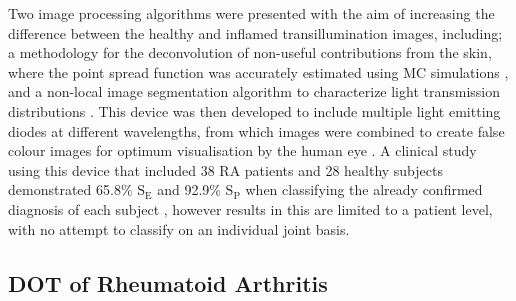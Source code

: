 \documentclass[twoside]{bhamthesis}
\theoremstyle{definition}
\begin{document}
Two image processing algorithms were presented with the aim of increasing the difference between the healthy and inflamed transillumination images, including; a methodology for the deconvolution of non-useful contributions from the skin, where the point spread function was accurately estimated using  MC simulations \cite{minet2005deconvolution}, and a non-local image segmentation algorithm to characterize light transmission distributions \cite{minet2007analysis}. This device was then developed to include multiple light emitting diodes at different wavelengths, from which images were combined to create false colour images for optimum visualisation by the human eye \cite{minet2010diagnosis}. A clinical study using this device that included 38 RA patients and 28 healthy subjects demonstrated 65.8\% $\mathrm{S_E}$ and 92.9\% $\mathrm{S_P}$ when classifying the already confirmed diagnosis of each subject \cite{amitai2015comparison}, however results in this are limited to a patient level, with no attempt to classify on an individual joint basis.

\subsection{DOT of Rheumatoid Arthritis}
\end{document}
